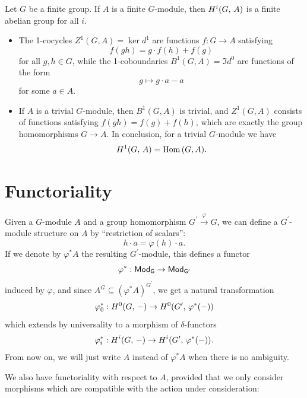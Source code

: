 \documentclass[a4paper, oneside]{memoir}
\begin{document}
\begin{corollary}
	Let $G$ be a finite group. If $A$ is a finite $G$-module, then $H^{i}( G, \, A )$ is a finite abelian group for all $i$.
\end{corollary}
\begin{example}
	\noindent
	\begin{itemize}
		\item The 1-cocycles $Z^1(G,A)=\ker{d^1}$ are functions $f: G\to A$ satisfying \[f(gh)=g\cdot f(h)+f(g)\] for all $g,h\in G$, while the 1-coboundaries $B^1(G,A)=\Im{d^0}$ are functions of the form \[g\mapsto g\cdot a-a\] for some $a\in A$.
		\item\label{ex:TrivialModH1} If $A$ is a trivial $G$-module, then $B^1(G,A)$ is trivial, and $Z^1(G,A)$ consists of functions satisfying $f(gh)=f(g)+f(h)$, which are exactly the group homomorphisms $G\to A$. In conclusion, for a trivial $G$-module we have \[H^{1}( G, \, A )=\operatorname{Hom}{(G,A)}.\]
	\end{itemize}
\end{example}

\section{Functoriality}

Given a $G$-module $A$ and a group homomorphism $ G^{\prime} \overset{\varphi}{\to} G$, we can define a $G^{\prime} $-module structure on $A$ by ``restriction of scalars'':
\[
	h\cdot a = \varphi(h)\cdot a.
\]
If we denote by $\varphi^* A$ the resulting $G^{\prime} $-module, this defines a functor
\[
	\varphi^* : \mathsf{Mod}_\mathsf{G}\to \mathsf{Mod}_\mathsf{G^\prime}
\]
induced by $\varphi$, and since $A^G\subseteq (\varphi^*A)^{G^{\prime}} $, we get a natural transformation
\[
	\varphi_0^*: H^{0}( G, \, - )\to H^{0}( G^{\prime} , \, \varphi^*(-) )
\]
which extends by universality to a morphism of $\delta$-functors
\[
	\varphi_i^*: H^{i}( G, \, - )\to H^{i}( G^{\prime} , \, \varphi^*(-) )
	.\]
From now on, we will just write $A$ instead of $\varphi^*A$ when there is no ambiguity.

We also have functoriality with respect to $A$, provided that we only consider morphisms which are compatible with the action under consideration:
\end{document}
